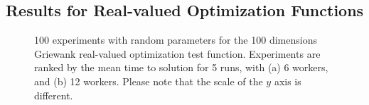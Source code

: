 \documentclass[conference]{IEEEtran}
\begin{document}
\subsection{Results for Real-valued Optimization Functions}
%
\begin{figure}[t]
    \centering

    \caption{100 experiments with random parameters for the 100 dimensions Griewank
    real-valued optimization test function. Experiments are ranked by
    the mean time to solution for 5 runs, with (a) 6 workers, and (b)
    12 workers. Please note that the scale of the $y$ axis is different.}
    \label{fig:griewank}
\end{figure}
%
\end{document}

